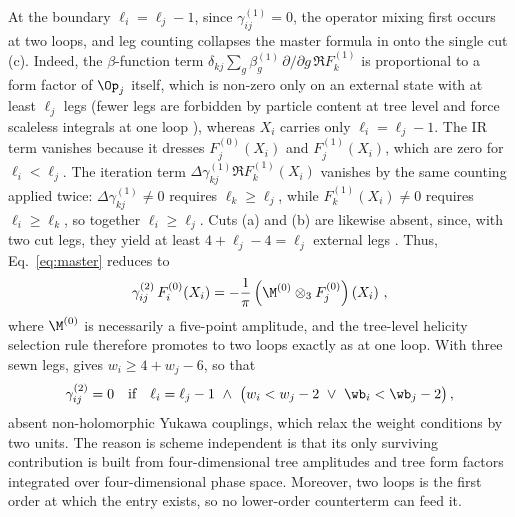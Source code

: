 At the boundary $\ell_i = \ell_j - 1$, since $\gamma_{ij}^{(1)} = 0$, the operator mixing first occurs at two loops, and leg counting collapses the master formula in  onto the single cut (c). 
Indeed, the $\beta$-function term $\delta_{kj}\sum_g\beta^{(1)}_g\,\partial/\partial g\,\Re F^{(1)}_k$ is proportional to a form factor of $\Op_j$ itself, which is non-zero only on an external state with at least $\ell_j$ legs (fewer legs are forbidden by particle content at tree level and force scaleless integrals at one loop \cite{Bern:2019wie}), whereas $X_i$ carries only $\ell_i=\ell_j-1$.
The IR term vanishes because it dresses $F^{(0)}_j(X_i)$ and $F^{(1)}_j(X_i)$, which are zero for $\ell_i < \ell_j$.
The iteration term $\Delta\gamma^{(1)}_{kj}\Re F^{(1)}_k(X_i)$ vanishes by the same counting applied twice: $\Delta\gamma^{(1)}_{kj}\neq0$ requires $\ell_k\ge\ell_j$, while $F^{(1)}_k(X_i)\neq0$ requires $\ell_i\ge\ell_k$, so together $\ell_i\ge\ell_j$.
Cuts (a) and (b) are likewise absent, since, with two cut legs, they yield at least $4+\ell_j-4=\ell_j$ external legs
\cite{Bern:2019wie,Bern:2020ikv,EliasMiro:2020tdv,Caron-Huot:2016cwu,EliasMiro:2021jgu}.
Thus, Eq.~\eqref{eq:master} reduces to
\begin{equation}
    \gamma_{ij}^{(2)}\, F_{i}^{(0)}(X_i) = -\frac{1}{\pi} \left(\M^{(0)} \otimes_3  F^{(0)}_j\right)\left(X_i\right)\,,
\end{equation}
where $\M^{(0)}$ is necessarily a five-point amplitude,
and the tree-level helicity selection rule therefore promotes to two loops exactly as at one loop. With three sewn legs,  gives $w_i \ge 4 + w_j - 6$, so that
\begin{equation}
\label{eq:dl1}
    \gamma^{(2)}_{ij} = 0 \ \ \ \text{if} \ \ \ \ell_i = \ell_j - 1 \ \land \  \big(w_i < w_j - 2  \ \lor  \ \wb_i < \wb_j - 2\big) \,,
\end{equation}
absent non-holomorphic Yukawa couplings, which relax the weight conditions by two units.
%
The reason  is scheme independent is that its only surviving contribution is built from four-dimensional tree amplitudes and tree form factors integrated over four-dimensional phase space.
Moreover, two loops is the first order at which the entry exists, so no lower-order counterterm can feed it.

